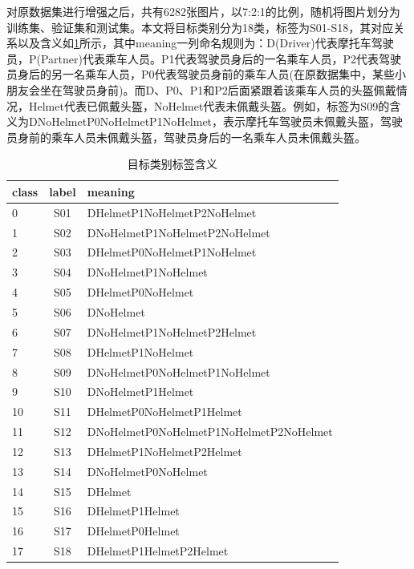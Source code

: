 对原数据集进行增强之后，共有6282张图片，以7:2:1的比例，随机将图片划分为训练集、验证集和测试集。本文将目标类别分为18类，标签为S01-S18，其对应关系以及含义如\ref{tab:newlabel}所示，其中meaning一列命名规则为：D(Driver)代表摩托车驾驶员，P(Partner)代表乘车人员。P1代表驾驶员身后的一名乘车人员，P2代表驾驶员身后的另一名乘车人员，P0代表驾驶员身前的乘车人员(在原数据集中，某些小朋友会坐在驾驶员身前)。而D、P0、P1和P2后面紧跟着该乘车人员的头盔佩戴情况，Helmet代表已佩戴头盔，NoHelmet代表未佩戴头盔。例如，标签为S09的含义为DNoHelmetP0NoHelmetP1NoHelmet，表示摩托车驾驶员未佩戴头盔，驾驶员身前的乘车人员未佩戴头盔，驾驶员身后的一名乘车人员未佩戴头盔。

\begin{table}[htb]
    \centering
    \caption[标签解释]{目标类别标签含义\label{tab:newlabel}}
    \begin{tabular}{lcl}
        \toprule
        \multicolumn{1}{c}{class} & \multicolumn{1}{c}{label} & \multicolumn{1}{l}{meaning} \\
        \midrule
        0 & S01 & DHelmetP1NoHelmetP2NoHelmet \\
        1 & S02 & DNoHelmetP1NoHelmetP2NoHelmet \\
        2 & S03 & DHelmetP0NoHelmetP1NoHelmet \\
        3 & S04 & DNoHelmetP1NoHelmet \\
        4 & S05 & DHelmetP0NoHelmet \\
        5 & S06 & DNoHelmet \\
        6 & S07 & DNoHelmetP1NoHelmetP2Helmet \\
        7 & S08 & DHelmetP1NoHelmet \\
        8 & S09 & DNoHelmetP0NoHelmetP1NoHelmet \\
        9 & S10 & DNoHelmetP1Helmet \\
        10 & S11 &  DHelmetP0NoHelmetP1Helmet \\
        11 & S12 &  DNoHelmetP0NoHelmetP1NoHelmetP2NoHelmet \\
        12 & S13 &  DHelmetP1NoHelmetP2Helmet \\
        13 & S14 &  DNoHelmetP0NoHelmet \\
        14 & S15 &  DHelmet \\
        15 & S16 &  DHelmetP1Helmet \\
        16 & S17 &  DHelmetP0Helmet \\
        17 & S18 &  DHelmetP1HelmetP2Helmet \\
        \bottomrule
    \end{tabular}
\end{table}

